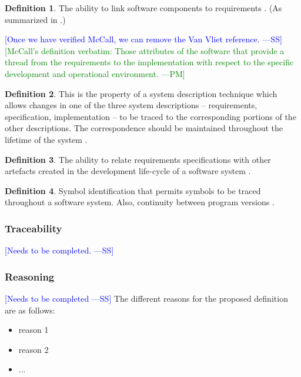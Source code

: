 \documentclass[letterpaper, cleveref]{lipics-v2019}
\newcommand{\authornote}[3]{\textcolor{#1}{[#3 ---#2]}}
\newcommand{\authornote}[3]{}
\newcommand{\wss}[1]{\authornote{blue}{SS}{#1}} %
\newcommand{\pmi}[1]{\authornote{green}{PM}{#1}} %
\theoremstyle{definition}
\newtheorem{defn}{Definition}
\begin{document}
\begin{defn}
  The ability to link software components to requirements
  \citep{McCallEtAl1977}. (As summarized in \citet{VanVliet2000}.)
\end{defn} \wss{Once we have verified McCall, we can remove the Van Vliet
reference.}  \pmi{McCall's definition verbatim: Those attributes of the
software that provide a thread from the requirements to the implementation
with respect to the specific development and operational environment.}

\begin{defn}
This is the property of a system description technique which allows changes in one of the three system descriptions -- requirements, specification, implementation -- to be traced to the corresponding portions of the other descriptions. The correspondence should be maintained throughout the lifetime of the system \citep{greenspan1978structuring}.
\end{defn}

\begin{defn}
The ability to relate requirements specifications with other artefacts created
in the development life-cycle of a software system \citep{spanoudakis2002plausible}.
\end{defn}

\begin{defn}
Symbol identification that permits symbols to be traced throughout a software system. Also, continuity between program versions \citep{graf1999modern}.
\end{defn}

\begin{mybox}
\subsubsection*{Traceability} 
\wss{Needs to be completed.}
\end{mybox}

\subsubsection*{Reasoning}

\wss{Needs to be completed}  The different reasons for the proposed definition
are as follows:

\begin{itemize}
  \item reason 1
  \item reason 2
  \item ...
\end{itemize}
\end{document}
